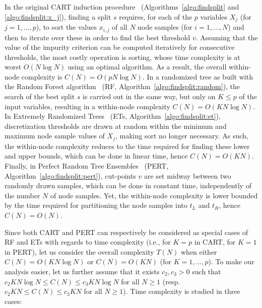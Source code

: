 In the original CART induction procedure~\citep{breiman:1984}
(Algorithms~\ref{algo:findsplit} and \ref{algo:findsplit:x_j}), finding a split
$s$  requires, for each of the $p$ variables $X_j$ (for $j=1,\dots,p$), to sort
the values $x_{i,j}$ of all $N$ node samples (for $i=1,\dots,N$) and then to
iterate over these in order to find the best threshold $v$. Assuming that the
value of the impurity criterion can be computed iteratively for consecutive
thresholds, the most costly operation
is sorting, whose time complexity is at worst $O(N \log N)$ using an optimal algorithm. As a result, the
overall within-node complexity is $C(N) = O(p N \log N)$. In a randomized tree
as built with the Random Forest algorithm~\citep{breiman:2001} (RF,
Algorithm~\ref{algo:findsplit:random}), the search of the best split $s$ is
carried out in the same way, but only on $K \leq p$ of the input variables,
resulting in a within-node complexity $C(N) = O(K N \log N)$. In Extremely
Randomized Trees~\citep{geurts:2006} (ETs, Algorithm~\ref{algo:findsplit:et}),
discretization thresholds are drawn at random within the minimum and maximum
node sample values of $X_j$, making sort no longer necessary. As such, the
within-node complexity reduces to the time required for finding these lower and
upper bounds, which can be done in linear time, hence $C(N)=O(KN)$. Finally, in
Perfect Random Tree Ensembles~\citep{cutler:2001} (PERT,
Algorithm~\ref{algo:findsplit:pert}), cut-points $v$ are set midway between two
randomly drawn samples, which can be done in constant time, independently of
the number $N$ of node samples. Yet, the within-node complexity is lower
bounded by the time required for partitioning the node samples into ${t_L}$ and
${t_R}$, hence $C(N)=O(N)$.

Since both CART and PERT can respectively be considered as special cases of RF
and ETs with regards to time complexity (i.e., for $K=p$ in CART, for $K=1$ in
PERT), let us consider the overall complexity $T(N)$ when either $C(N)=O(KN\log
N)$ or $C(N)=O(KN)$ (for $K=1,\dots,p$). To make our analysis easier, let us
further assume that it exists $c_2, c_3 > 0$ such that $c_2 KN \log N \leq C(N) \leq c_3 KN \log N$ for
all $N \geq 1$ (resp. $c_2 KN \leq C(N) \leq c_3 KN$ for all $N \geq 1$). Time complexity
is studied in three cases:

